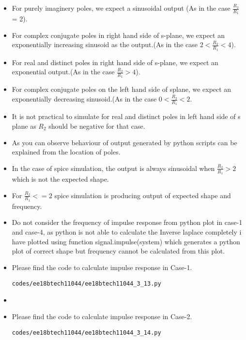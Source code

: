 \begin{enumerate}[label=\arabic*.,ref=\theenumi]
\begin{itemize}
\item For purely imaginery poles, we expect a sinusoidal output (As in the case $\frac{R_2}{R_1}$ = 2).
\item For complex conjugate poles in right hand side of s-plane, we expect an exponentially increasing sinusoid as the output.(As in the case $2 < \frac{R_2}{R_1} < 4$).
\item For real and distinct poles in right hand side of s-plane, we expect an exponential  output.(As in the case $\frac{R_2}{R_1} > 4$).
\item For complex conjugate poles on the left hand side of splane, we expect an exponentially decreasing sinusoid.(As in the case $0 <  \frac{R_2}{R_1} < 2$.
\item It is not practical to simulate for real and distinct poles in left hand side of s plane as $R_2$ should be negative for that case. 
\item As you can observe behaviour of output generated by python scripts can be explained from the location of poles.
\item In the case of spice simulation, the output is always sinusoidal when $\frac{R_2}{R_1} > 2$ which is not the expected shape. 
\item For $\frac{R_2}{R_1} <= 2$ spice simulation is producing output of expected shape and frequency. 
\item Do not consider the frequency of impulse response from python plot in case-1 and case-4, as python is not able to calculate the Inverse laplace completely i have plotted using function signal.impulse(system) which generates a python plot of correct shape but frequency cannot be calculated from this plot.
\item Please find the code to calculate impulse response in Case-1.
\begin{lstlisting}
codes/ee18btech11044/ee18btech11044_3_13.py
\end{lstlisting}
\item \item Please find the code to calculate impulse response in Case-2.
\begin{lstlisting}
codes/ee18btech11044/ee18btech11044_3_14.py
\end{lstlisting}

\end{itemize}

\end{enumerate}
